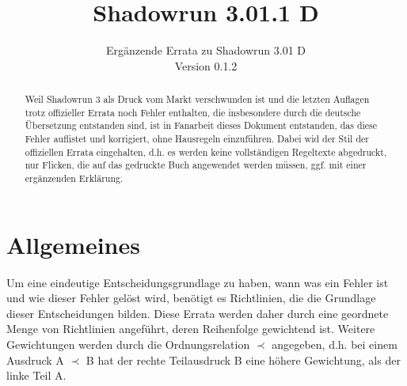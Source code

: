 \documentclass[a4paper]{scrartcl}
\title{Shadowrun 3.01.1 D}
\subtitle{Ergänzende Errata zu Shadowrun 3.01 D\\Version 0.1.2}
\author{\small\projekturl}
\begin{document}
\maketitle

\begin{abstract}
Weil Shadowrun 3 als Druck vom Markt verschwunden ist und die letzten Auflagen trotz offizieller Errata noch Fehler enthalten, die insbesondere durch die deutsche Übersetzung entstanden sind, ist in Fanarbeit dieses Dokument entstanden, das diese Fehler auflistet und korrigiert, ohne Hausregeln einzuführen. Dabei wid der Stil der offiziellen Errata eingehalten, d.h. es werden keine vollständigen Regeltexte abgedruckt, nur Flicken, die auf das gedruckte Buch angewendet werden müssen, ggf. mit einer ergänzenden Erklärung.
\end{abstract}

\tableofcontents

\section{Allgemeines}
Um eine eindeutige Entscheidungsgrundlage zu haben, wann was ein Fehler ist und wie dieser Fehler gelöst wird, benötigt es Richtlinien, die die Grundlage dieser Entscheidungen bilden.
Diese Errata werden daher durch eine geordnete Menge von Richtlinien angeführt, deren Reihenfolge gewichtend ist. Weitere Gewichtungen werden durch die Ordnungsrelation $\prec$ angegeben, d.h. bei einem Ausdruck \glqq A $\prec$ B\grqq{} hat der rechte Teilausdruck \glqq B\grqq{} eine höhere Gewichtung, als der linke Teil \glqq A\grqq.
\end{document}
